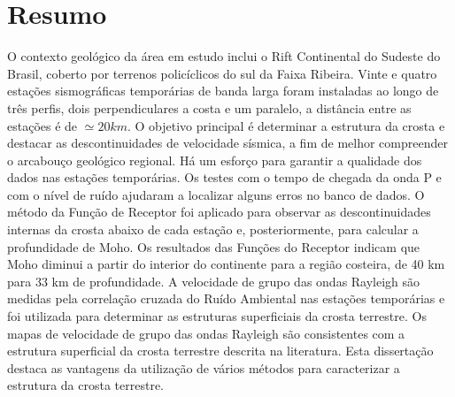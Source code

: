 \chapter*{Resumo}	

O contexto geológico da área em estudo inclui o Rift Continental do Sudeste do Brasil, coberto por terrenos policíclicos do sul da Faixa Ribeira. Vinte e quatro estações sismográficas temporárias de banda larga foram instaladas ao longo de três perfis, dois perpendiculares a costa e um paralelo, a distância entre as estações é de $\simeq 20 km$.  O objetivo principal é determinar a estrutura da crosta e destacar as descontinuidades de velocidade sísmica, a fim de melhor compreender o arcabouço geológico regional. Há um esforço para garantir a qualidade dos dados nas estações temporárias. Os testes com o tempo de chegada da onda P e com o nível de ruído ajudaram a localizar alguns erros no banco de dados. O método da Função de Receptor foi aplicado para observar as descontinuidades internas da crosta abaixo de cada estação e, posteriormente, para calcular a profundidade de Moho. Os resultados das Funções do Receptor indicam que Moho diminui a partir do interior do continente para a região costeira, de 40 km para 33 km de profundidade. A velocidade de grupo das ondas Rayleigh são medidas pela correlação cruzada do Ruído Ambiental nas estações temporárias e foi utilizada para determinar as estruturas superficiais da crosta terrestre. Os mapas de velocidade de grupo das ondas Rayleigh são consistentes com a estrutura superficial da crosta terrestre descrita na literatura. Esta dissertação destaca as vantagens da utilização de vários métodos para caracterizar a estrutura da crosta terrestre.